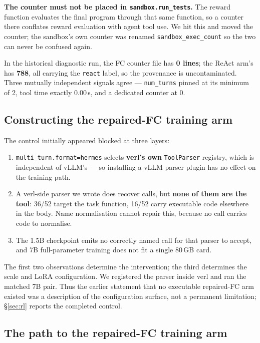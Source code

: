 \textbf{The counter must not be placed in \texttt{sandbox.run\_tests}.} The reward function
evaluates the final program through that same function, so a counter there conflates reward
evaluation with agent tool use. We hit this and moved the counter; the sandbox's own counter
was renamed \texttt{sandbox\_exec\_count} so the two can never be confused again.

In the historical diagnostic run, the FC counter file has \textbf{0 lines}; the ReAct arm's has \textbf{788}, all
carrying the \texttt{react} label, so the provenance is uncontaminated. Three mutually
independent signals agree --- \texttt{num\_turns} pinned at its minimum of 2, tool time
exactly 0.00\,s, and a dedicated counter at 0.

\subsection{Constructing the repaired-FC training arm}

The control initially appeared blocked at three layers:

\begin{enumerate}
\tightlist
\item \texttt{multi\_turn.format=hermes} selects \textbf{verl's own} \texttt{ToolParser}
  registry, which is independent of vLLM's --- so installing a vLLM parser plugin has no
  effect on the training path.
\item A verl-side parser we wrote does recover calls, but \textbf{none of them are the tool}:
  36/52 target the task function, 16/52 carry executable code elsewhere in the body. Name
  normalisation cannot repair this, because no call carries code to normalise.
\item The 1.5B checkpoint emits no correctly named call for that parser to accept, and 7B
  full-parameter training does not fit a single 80\,GB card.
\end{enumerate}

The first two observations determine the intervention; the third determines the scale and LoRA
configuration. We registered the parser inside verl and ran the matched 7B pair. Thus the earlier
statement that no executable repaired-FC arm existed was a description of the configuration
surface, not a permanent limitation; \S\ref{sec:rl} reports the completed control.

\subsection{The path to the repaired-FC training arm}
\label{app:norepair}

